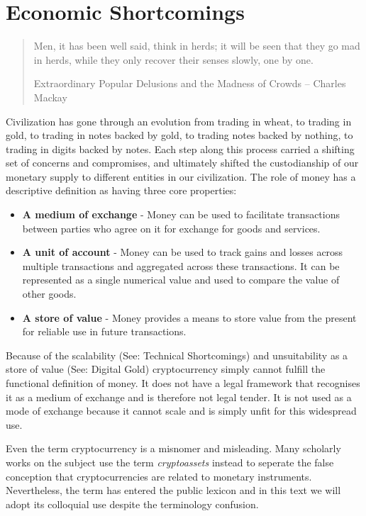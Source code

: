 \chapter{Economic Shortcomings}

\begin{quote}
Men, it has been well said, think in herds; it will be seen that they go mad in herds, while they only recover their senses slowly, one by one.
\begin{flushright}
Extraordinary Popular Delusions and the Madness of Crowds -- Charles Mackay
\end{flushright}
\end{quote}

Civilization has gone through an evolution from trading in wheat, to trading in
gold, to trading in notes backed by gold, to trading notes backed by nothing, to
trading in digits backed by notes. Each step along this process carried a
shifting set of concerns and compromises, and ultimately shifted the
custodianship of our monetary supply to different entities in our civilization.
The role of money has a descriptive definition as having three core properties:

\begin{itemize}
\tightlist
\item
  \textbf{A medium of exchange} - Money can be used to facilitate transactions
  between parties who agree on it for exchange for goods and
  services.
\item
  \textbf{A unit of account} - Money can be used to track gains and losses across
  multiple transactions and aggregated across these transactions. It can be
  represented as a single numerical value and used to compare the value of
  other goods.
\item
  \textbf{A store of value} - Money provides a means to store value from the
  present for reliable use in future transactions.
\end{itemize}

Because of the scalability (See: Technical Shortcomings) and unsuitability as a
store of value (See: Digital Gold) cryptocurrency simply cannot fulfill the
functional definition of money. It does not have a legal framework that
recognises it as a medium of exchange and is therefore not legal tender.  It is
not used as a mode of exchange because it cannot scale and is simply unfit for
this widespread use. \cite{roubini2018exploring, budish2018economic}

Even the term cryptocurrency is a misnomer and misleading. Many scholarly works
on the subject use the term \textit{cryptoassets} instead to seperate the false
conception that cryptocurrencies are related to monetary instruments.
Nevertheless, the term has entered the public lexicon and in this text we will
adopt its colloquial use despite the terminology confusion.

